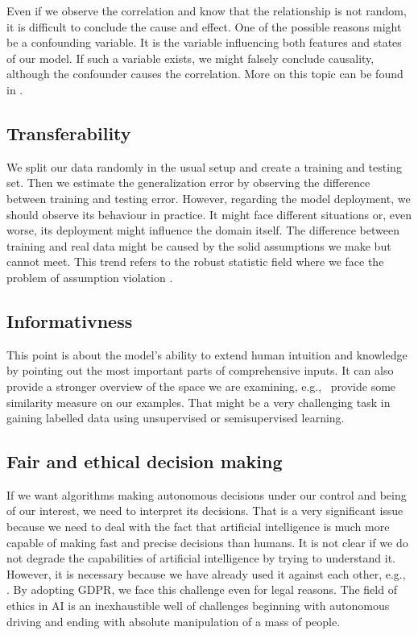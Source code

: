 Even if we observe the correlation and know that the relationship is not random, it is difficult to conclude the cause and effect. One of the possible reasons might be a confounding variable. It is the variable influencing both features and states of our model. If such a variable exists, we might falsely conclude causality, although the confounder causes the correlation. More on this topic can be found in \cite{Skelly2012}.

\subsection{Transferability}
We split our data randomly in the usual setup and create a training and testing set. Then we estimate the generalization error by observing the difference between training and testing error. However, regarding the model deployment, we should observe its behaviour in practice. It might face different situations or, even worse, its deployment might influence the domain itself. The difference between training and real data might be caused by the solid assumptions we make but cannot meet. This trend refers to the robust statistic field where we face the problem of assumption violation \cite{Erceg-Hurn2008}.

\subsection{Informativness}
This point is about the model's ability to extend human intuition and knowledge by pointing out the most important parts of comprehensive inputs. It can also provide a stronger overview of the space we are examining, e.g., \ provide some similarity measure on our examples. That might be a very challenging task in gaining labelled data using unsupervised or semisupervised learning.

\subsection{Fair and ethical decision making}
If we want algorithms making autonomous decisions under our control and being of our interest, we need to interpret its decisions. That is a very significant issue because we need to deal with the fact that artificial intelligence is much more capable of making fast and precise decisions than humans. It is not clear if we do not degrade the capabilities of artificial intelligence by trying to understand it. However, it is necessary because we have already used it against each other, e.g., \cite{Boldyreva2018}. By adopting GDPR, we face this challenge even for legal reasons. The field of ethics in AI \cite{Siau2020} is an inexhaustible well of challenges beginning with autonomous driving and ending with absolute manipulation of a mass of people.

